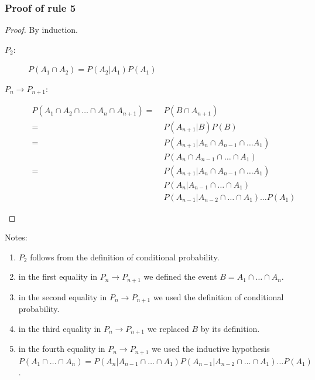 \begin{frame}
    \frametitle{Proof of rule 5}

    \tiny
    \begin{proof}
        By induction.

        \begin{description}
            \item[$P_2$:] $P(A_1\cap A_2)=P(A_2|A_1)P(A_1)$
            \item[$P_n\rightarrow P_{n+1}$:]
                \begin{align*}
                    P(A_1\cap A_2\cap\ldots\cap A_n\cap A_{n+1})=\;&P(B\cap A_{n+1})\\
                    =\;&P(A_{n+1}|B)P(B)\\
                    =\;&P(A_{n+1}|A_n\cap A_{n-1}\cap\ldots A_1)\\
                       &P(A_n\cap A_{n-1}\cap\ldots\cap A_1)\\
                    =\;&P(A_{n+1}|A_n\cap A_{n-1}\cap\ldots A_1)\\
                       &P(A_n|A_{n-1}\cap\ldots\cap A_1)\\
                       &P(A_{n-1}|A_{n-2}\cap\ldots\cap A_1)\ldots P(A_1)
                \end{align*}
        \end{description}
    \end{proof}
    Notes:
    \begin{enumerate}
        \item $P_2$ follows from the definition of conditional probability.
        \item in the first equality in $P_n\rightarrow P_{n+1}$ we defined the
            event $B=A_1\cap\ldots\cap A_n$.
        \item in the second equality in $P_n\rightarrow P_{n+1}$ we used the
            definition of conditional probability.
        \item in the third equality in $P_n\rightarrow P_{n+1}$ we replaced $B$
            by its definition.
        \item in the fourth equality in $P_n\rightarrow P_{n+1}$ we used the
            inductive hypothesis $P(A_1\cap\ldots\cap A_n) =
            P(A_n|A_{n-1}\cap\ldots\cap A_1)P(A_{n-1}|A_{n-2}\cap\ldots\cap
            A_1)\ldots P(A_1)$.
    \end{enumerate}
\end{frame}

